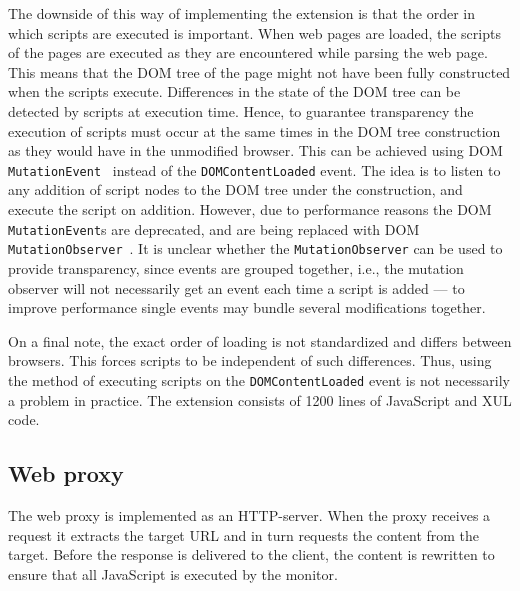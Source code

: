 \documentclass{llncs}
\newcommand{\todo}[1]{\colorbox{red}{\textcolor{white}{\sffamily\bfseries\scriptsize TODO}} \textcolor{red}{#1} \textcolor{red}{$\blacktriangleleft$}}
\begin{document}
The downside of this way of implementing the extension is that 
the order in which scripts are executed is important.  When web pages
are loaded, the scripts of the pages are executed as they are encountered while
parsing the web page. This means that the DOM tree of the page might not have
been fully constructed when the scripts execute. Differences in the state of
the DOM tree can be detected by scripts at execution time. Hence, to guarantee
transparency the execution of scripts must occur at the same times in the DOM
tree construction as they would have in the unmodified browser.
This can be achieved using DOM \lstinline{MutationEvent}~\cite{DOM3Event}
instead of the \lstinline{DOMContentLoaded} event.  The idea is to listen
to any addition of script nodes to the DOM tree under the construction, and
execute the script on addition.  However, due to performance reasons the DOM
\lstinline{MutationEvent}s are deprecated, and are being replaced with DOM \lstinline{MutationObserver}~\cite{DOM4}. 
It is unclear whether the \lstinline{MutationObserver} can be used to
provide transparency, since events are grouped together, i.e., the mutation
observer will not necessarily get an event each time a script is added ---
to improve performance single
events may bundle several modifications together.

On a final note, the exact order of loading is not standardized and differs between
browsers. This forces scripts to be independent of such differences. Thus,
using the method of executing scripts on the \lstinline{DOMContentLoaded} event is not
necessarily a problem in practice. 
%
The extension consists of 1200 lines of JavaScript and XUL code.



\vspace{-.4cm}
\subsection{Web proxy}
\vspace{-.2cm}

The web proxy is implemented as an HTTP-server. When the 
proxy receives a request it extracts the target URL and in turn requests the 
content from the target. Before the response is delivered to the client, the content is 
rewritten to ensure that all JavaScript is executed by the monitor. 
\end{document}
